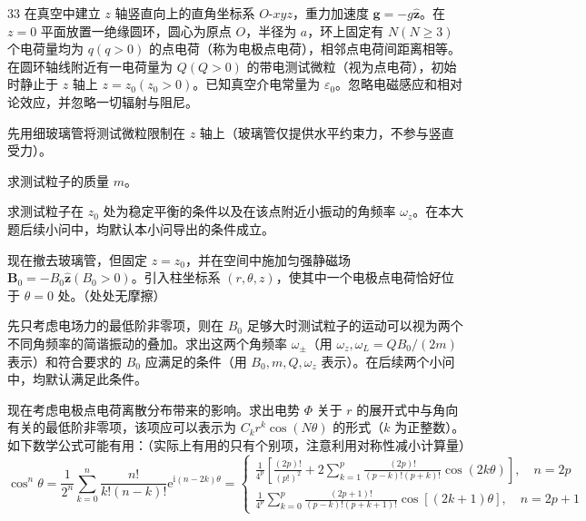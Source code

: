 \begin{problem}[2026年博知汇BWPhO][旋转电场的曳引]{33}
    在真空中建立 $z$ 轴竖直向上的直角坐标系 $O$-$xyz$，重力加速度 $\pmb{g} = -g\hat{\pmb{z}}$。在 $z=0$ 平面放置一绝缘圆环，圆心为原点 $O$，半径为 $a$，环上固定有 $N (N \geq 3)$ 个电荷量均为 $q (q > 0)$ 的点电荷（称为电极点电荷），相邻点电荷间距离相等。在圆环轴线附近有一电荷量为 $Q (Q > 0)$ 的带电测试微粒（视为点电荷），初始时静止于 $z$ 轴上 $z = z_{0} (z_{0} > 0)$。已知真空介电常量为 $\varepsilon_{0}$。忽略电磁感应和相对论效应，并忽略一切辐射与阻尼。
    \begin{subproblem}
        先用细玻璃管将测试微粒限制在 $z$ 轴上（玻璃管仅提供水平约束力，不参与竖直受力）。
        \begin{subsubproblem}
            求测试粒子的质量 $m$。
        \end{subsubproblem}
        \begin{subsubproblem}
            求测试粒子在 $z_0$ 处为稳定平衡的条件以及在该点附近小振动的角频率 $\omega_z$。在本大题后续小问中，均默认本小问导出的条件成立。
        \end{subsubproblem}
    \end{subproblem}
    \begin{subproblem}
        现在撤去玻璃管，但固定 $z = z_0$，并在空间中施加匀强静磁场 $\pmb{B}_0 = -B_0\hat{\pmb{z}} (B_0 > 0)$。引入柱坐标系 $(r,\theta ,z)$，使其中一个电极点电荷恰好位于 $\theta = 0$ 处。（处处无摩擦）
        \begin{subsubproblem}
            先只考虑电场力的最低阶非零项，则在 $B_{0}$ 足够大时测试粒子的运动可以视为两个不同角频率的简谐振动的叠加。求出这两个角频率 $\omega_{\pm}$（用 $\omega_{z},\omega_{L} = QB_{0} / (2m)$ 表示）和符合要求的 $B_{0}$ 应满足的条件（用 $B_{0},m,Q,\omega_{z}$ 表示）。在后续两个小问中，均默认满足此条件。
        \end{subsubproblem}
        \begin{subsubproblem}
            现在考虑电极点电荷离散分布带来的影响。求出电势 $\varPhi$ 关于 $r$ 的展开式中与角向有关的最低阶非零项，该项应可以表示为 $C_k r^k \cos(N\theta)$ 的形式（$k$ 为正整数）。如下数学公式可能有用：（实际上有用的只有个别项，注意利用对称性减小计算量）
            \begin{equation}
                \cos^ {n} \theta = \frac {1}{2 ^ {n}} \sum_ {k = 0} ^ {n} \frac {n !}{k ! (n - k) !} \mathrm{e} ^ {\mathrm{i} (n - 2 k) \theta} = \left\{ \begin{array}{l} \displaystyle \frac {1}{4 ^ {p}} \left[ \frac {(2 p) !}{(p !) ^ {2}} + 2 \sum_ {k = 1} ^ {p} \frac {(2 p) !}{(p - k) ! (p + k) !} \cos (2 k \theta) \right], \quad n = 2 p \\ \displaystyle \frac {1}{4 ^ {p}} \sum_ {k = 0} ^ {p} \frac {(2 p + 1) !}{(p - k) ! (p + k + 1) !} \cos [ (2 k + 1) \theta ], \quad n = 2 p + 1 \end{array} \right.

\end{equation}
\end{subsubproblem}
\end{subproblem}
\end{problem}
